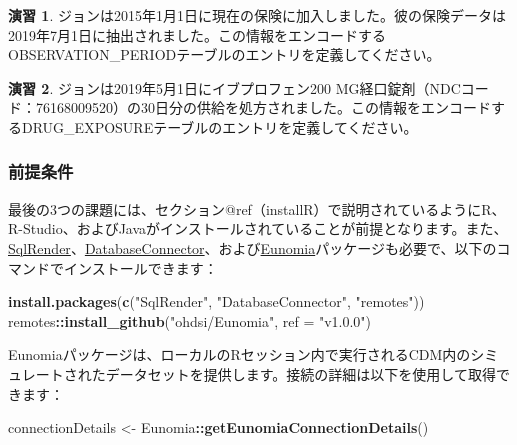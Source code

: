 \documentclass[
  11pt]{book}
\newenvironment{Shaded}{\begin{snugshade}}{\end{snugshade}}
\newcommand{\AttributeTok}[1]{\textcolor[rgb]{0.13,0.29,0.53}{#1}}
\newcommand{\FunctionTok}[1]{\textcolor[rgb]{0.13,0.29,0.53}{\textbf{#1}}}
\newcommand{\NormalTok}[1]{#1}
\newcommand{\OtherTok}[1]{\textcolor[rgb]{0.56,0.35,0.01}{#1}}
\newcommand{\SpecialCharTok}[1]{\textcolor[rgb]{0.81,0.36,0.00}{\textbf{#1}}}
\newcommand{\StringTok}[1]{\textcolor[rgb]{0.31,0.60,0.02}{#1}}
\theoremstyle{definition}
\theoremstyle{definition}
\theoremstyle{definition}
\newtheorem{exercise}{演習}[chapter]
\theoremstyle{definition}
\theoremstyle{remark}
\begin{document}
\begin{exercise}
\protect\hypertarget{exr:exerciseJohnOp}{}\label{exr:exerciseJohnOp}ジョンは2015年1月1日に現在の保険に加入しました。彼の保険データは2019年7月1日に抽出されました。この情報をエンコードするOBSERVATION\_PERIODテーブルのエントリを定義してください。
\end{exercise}

\begin{exercise}
\protect\hypertarget{exr:exerciseJohnDrug}{}\label{exr:exerciseJohnDrug}ジョンは2019年5月1日にイブプロフェン200 MG経口錠剤（NDCコード：76168009520）の30日分の供給を処方されました。この情報をエンコードするDRUG\_EXPOSUREテーブルのエントリを定義してください。
\end{exercise}

\subsubsection*{前提条件}\label{ux524dux63d0ux6761ux4ef6-1}

最後の3つの課題には、セクション@ref（installR）で説明されているようにR、R-Studio、およびJavaがインストールされていることが前提となります。また、\href{https://ohdsi.github.io/SqlRender/}{SqlRender}、\href{https://ohdsi.github.io/DatabaseConnector/}{DatabaseConnector}、および\href{https://ohdsi.github.io/Eunomia/}{Eunomia}パッケージも必要で、以下のコマンドでインストールできます：

\begin{Shaded}
\begin{Highlighting}[]
\FunctionTok{install.packages}\NormalTok{(}\FunctionTok{c}\NormalTok{(}\StringTok{"SqlRender"}\NormalTok{, }\StringTok{"DatabaseConnector"}\NormalTok{, }\StringTok{"remotes"}\NormalTok{))}
\NormalTok{remotes}\SpecialCharTok{::}\FunctionTok{install\_github}\NormalTok{(}\StringTok{"ohdsi/Eunomia"}\NormalTok{, }\AttributeTok{ref =} \StringTok{"v1.0.0"}\NormalTok{)}
\end{Highlighting}
\end{Shaded}

Eunomiaパッケージは、ローカルのRセッション内で実行されるCDM内のシミュレートされたデータセットを提供します。接続の詳細は以下を使用して取得できます：

\begin{Shaded}
\begin{Highlighting}[]
\NormalTok{connectionDetails }\OtherTok{\textless{}{-}}\NormalTok{ Eunomia}\SpecialCharTok{::}\FunctionTok{getEunomiaConnectionDetails}\NormalTok{()}
\end{Highlighting}
\end{Shaded}
\end{document}
